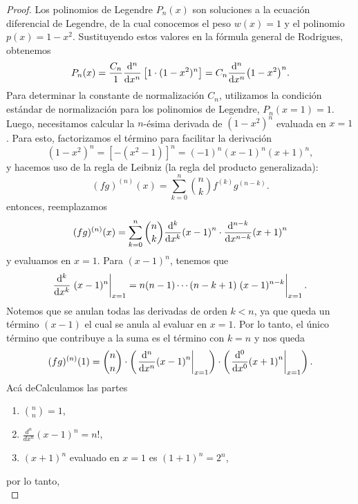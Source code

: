 \documentclass[11pt]{article}
\theoremstyle{definition}
\numberwithin{equation}{section}
\begin{document}
\begin{proof}
	Los polinomios de Legendre $P_n(x)$ son soluciones a la ecuación diferencial de Legendre, de la cual conocemos el peso $w(x) = 1$ y el polinomio $p(x) = 1 - x^2$. Sustituyendo estos valores en la fórmula general de Rodrigues, obtenemos
	\begin{equation}
    P_n(x) = \frac{C_n}{1} \dv[n]{x} \left[ 1 \cdot (1 - x^2)^n \right] = C_n \dv[n]{x} (1 - x^2)^n.
	\end{equation}
	Para determinar la constante de normalización $C_n$, utilizamos la condición estándar de normalización para los polinomios de Legendre, $P_n(x=1) = 1$. Luego, necesitamos calcular la $n$-ésima derivada de $(1 - x^2)^n$ evaluada en $x = 1$. Para esto, factorizamos el término para facilitar la derivación
	\begin{equation}
		(1 - x^2)^n = [-(x^2 - 1)]^n = (-1)^n (x - 1)^n (x + 1)^n,
	\end{equation}
	y hacemos uso de la regla de Leibniz (la regla del producto generalizada):
	\begin{equation}
		(fg)^{(n)}(x) = \sum_{k=0}^{n} \binom{n}{k} f^{(k)} g^{(n-k)}.
	\end{equation}
	entonces, reemplazamos
	\begin{equation}
		(fg)^{(n)}(x) =  \sum_{k=0}^{n} \binom{n}{k} \dv[k]{x} (x - 1)^n \cdot \dv[n-k]{x} (x + 1)^n
	\end{equation}
	y evaluamos en $x = 1$. Para $(x-1)^n$, tenemos que
	\begin{equation}
		\dv[k]{x} \eval{(x-1)^n}_{x=1}= n(n-1)\cdots(n-k+1)\eval{(x-1)^{n-k}}_{x=1}.
	\end{equation}
	Notemos que se anulan todas las derivadas de orden $k < n$, ya que queda un término $(x - 1)$ el cual se anula al evaluar en $x = 1$. Por lo tanto, el único término que contribuye a la suma es el término con $k = n$ y nos queda
	\begin{equation}
		(fg)^{(n)}(1) = \binom{n}{n} \cdot \left( \left. \dv[n]{x} (x-1)^n \right|_{x=1} \right) \cdot \left( \left. \dv[0]{x} (x+1)^n \right|_{x=1} \right).
	\end{equation}
	Acá deCalculamos las partes
	\begin{enumerate}
		\item $\binom{n}{n} = 1$,
		\item $\frac{d^n}{dx^n} (x-1)^n = n!$,
		\item $(x+1)^n$ evaluado en $x = 1$ es $(1+1)^n = 2^n$,
	\end{enumerate}
	por lo tanto,
	\begin{equation}

\end{equation}
\end{proof}
\end{document}

